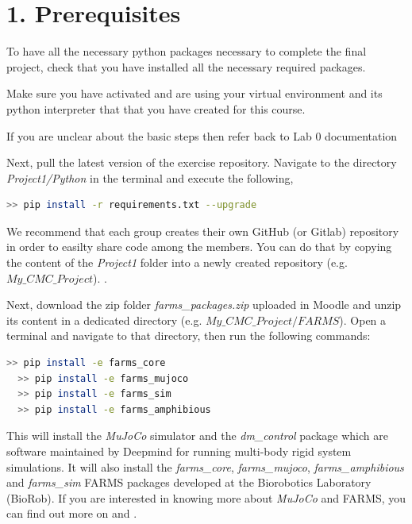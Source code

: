 \documentclass{cmc}
\begin{document}
\section*{1. Prerequisites}
To have all the necessary python packages necessary to complete the
final project, check that you have installed all the necessary required packages.

 Make sure you have activated and are using your
virtual environment and its python interpreter that that you have created for
this course.

 If you are unclear about the basic steps then refer back
to Lab 0 documentation

Next, pull the latest version of the exercise repository. Navigate to the
directory \textit{Project1/Python} in the terminal and execute the following,

\begin{lstlisting}[language=Bash]
  >> pip install -r requirements.txt --upgrade
\end{lstlisting}

We recommend that each group creates their own GitHub (or Gitlab) repository in order to easilty share code among the members. You can do that by copying the content of the \textit{Project1} folder into a newly created repository (e.g. $My\_CMC\_Project$).
\newline
{}.

Next, download the zip folder \textit{farms\_packages.zip} uploaded in Moodle and unzip its content in a dedicated directory (e.g. $My\_CMC\_Project/FARMS$). Open a terminal and navigate to that directory, then run the following commands:

\label{sec:mujoco-inst}
\begin{lstlisting}[language=Bash]
  >> pip install -e farms_core
  >> pip install -e farms_mujoco
  >> pip install -e farms_sim
  >> pip install -e farms_amphibious
\end{lstlisting}

This will install the \textit{MuJoCo} simulator and the \textit{dm\_control}
package which are software maintained by Deepmind for running multi-body rigid system
simulations. It will also install the \textit{farms\_core},
\textit{farms\_mujoco}, \textit{farms\_amphibious} and \textit{farms\_sim} FARMS packages developed at the
Biorobotics Laboratory (BioRob). If you are interested in knowing more about
\textit{MuJoCo} and FARMS, you can find out more on \href{https://mujoco.org/}{} and \href{https://www.biorxiv.org/content/10.1101/2023.09.25.559130v1https://www.biorxiv.org/content/10.1101/2023.09.25.559130v1}{}.
\end{document}
